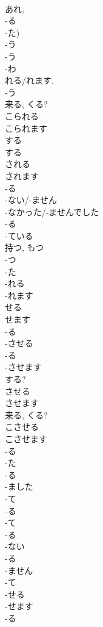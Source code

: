 \documentclass[8pt]{extreport}
\begin{document}
\begin{CJK}{UTF8}{min}
\\	あれ, 
\\	-る 
\\	-た)	
\\	-う 
\\	-う 
\\	-わ 
\\	れる/れます.	
\\	-う 
\\	来る, くる?	
\\	こられる
\\	こられます
\\	する 
\\	する 
\\	される
\\	されます
\\	-る 
\\	-ない/-ません 
\\	-なかった/-ませんでした 
\\	-る 
\\	-ている	
\\	持つ, もつ 
\\	-つ 
\\	-た 
\\	-れる 
\\	-れます
\\	せる
\\	せます
\\	-る 
\\	-させる
\\	-る 
\\	-させます
\\	する?	
\\	させる
\\	させます
\\	来る, くる?
\\	こさせる
\\	こさせます
\\	-る 
\\	-た
\\	-る 
\\	-ました
\\	-て 
\\	-る 
\\	-て	
\\	-る 
\\	-ない
\\	-る 
\\	-ません
\\	-て 
\\	-せる 
\\	-せます
\\	-る 

\end{CJK}
\end{document}
